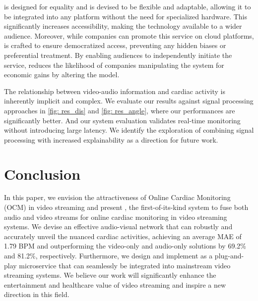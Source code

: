  \sysname is designed for equality and is devised to be flexible and adaptable, allowing it to be integrated into any platform without the need for specialized hardware. This significantly increases accessibility, making the technology available to a wider audience. Moreover, while companies can promote this service on cloud platforms, \sysname is crafted to ensure democratized access, preventing any hidden biases or preferential treatment. By enabling audiences to independently initiate the service, \sysname reduces the likelihood of companies manipulating the system for economic gains by altering the model.

 The relationship between video-audio information and cardiac activity is inherently implicit and complex. We evaluate our results against signal processing approaches in \fig\ref{fig: res_dis} and \fig\ref{fig: res_angle}, where our performances are significantly better. And our system evaluation validates real-time monitoring without introducing large latency. We identify the exploration of combining signal processing with increased explainability as a direction for future work.


\section{Conclusion}
In this paper, we envision the attractiveness of Online Cardiac Monitoring (OCM) in video streaming 
and present \sysname, the first-of-its-kind system to fuse both audio and video streams for online cardiac monitoring in video streaming systems. We devise an effective audio-visual network that can robustly and accurately unveil the nuanced cardiac activities, achieving an average MAE of 1.79 BPM and outperforming the video-only and audio-only solutions by 69.2\% and 81.2\%, respectively. Furthermore, we design and implement \sysname as a plug-and-play microservice that can seamlessly be integrated into mainstream video streaming systems. We believe our work will significantly enhance the entertainment and healthcare value of video streaming and inspire a new direction in this field.

